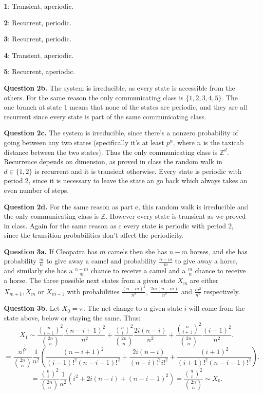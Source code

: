 \documentclass[letterpaper, reqno,11pt]{article}
\begin{document}
{\bf 1}: Transient, aperiodic.

{\bf 2}: Recurrent, periodic.

{\bf 3}: Recurrent, periodic.

{\bf 4}: Transient, aperiodic.

{\bf 5}: Recurrent, aperiodic.

{\medskip\noindent\bf Question 2b.} The system is irreducible, as every state is accessible from the others. For the same reason the only communicating class is $\{1, 2, 3, 4, 5\} $. The one branch at state 1 means that none of the states are periodic, and they are all recurrent since every state is part of the same communicating class.

{\medskip\noindent\bf Question 2c.} The system is irreducible, since there's a nonzero probability of going between any two states (specifically it's at least $p^{n}$, where $n$ is the taxicab distance between the two states). Thus the only communicating class is $\mathbb{Z}^{d}$. Recurrence depends on dimension, as proved in class the random walk in $d\in \{1,2\} $ is recurrent and it is transient otherwise. Every state is periodic with period 2, since it is necessary to leave the state an go back which always takes an even number of steps. 

{\medskip\noindent\bf Question 2d.} For the same reason as part c, this random walk is irreducible and the only communicating class is $\mathbb{Z}$. However every state is transient as we proved in class. Again for the same reason as c every state is periodic with period 2, since the transition probabilities don't affect the periodicity. 

{\medskip\noindent\bf Question 3a.} If Cleopatra has $m$ camels then she has $n-m$ horses, and she has probability $\frac{m}{n}$ to give away a camel and probability $\frac{n-m}{m}$ to give away a horse, and similarly she has a $\frac{n-m}{m}$ chance to receive a camel and a $\frac{m}{n}$ chance to receive a horse. The three possible next states from a given state $X_m$ are either $X_{m+1},X_{m}$ or $X_{m-1}$ with probabilities $\frac{(n-m)^2}{n^2}$, $\frac{2m(n-m)}{n^2}$ and $\frac{m^2}{n^2}$ respectively.

{\medskip\noindent\bf Question 3b.} Let $X_0=\pi$. The net change to a given state $i$ will come from the state above, below or staying the same. Thus: 
\[
    X_1\sim\frac{{n\choose i-1}^2}{{2n\choose n}}\frac{\left( n-i+1 \right)^2 }{n^2}+\frac{{n\choose i}^2}{{2n\choose n}}\frac{2i(n-i)}{n^2}+\frac{{n\choose i+1}^2}{{2n\choose n}}\frac{(i+1)^2}{n^2}
.\]
\[
    =\frac{n!^2}{{2n\choose n}}\frac{1}{n^2}\left( \frac{(n-i+1)^2}{(i-1)!^2(n-i+1)!^2}+\frac{2i(n-i)}{(n-i)!^2i!^2}+\frac{(i+1)^2}{(i+1)!^2(n-i-1)!^2} \right) 
.\]
\[
=\frac{{n\choose i}^2}{{2n\choose n}}\frac{1}{n^2}\left( i^2+2i(n-i)+(n-i-1)^2 \right)=\frac{{n\choose i}^2}{{2n\choose n}}\sim X_0
.\]
\end{document}

